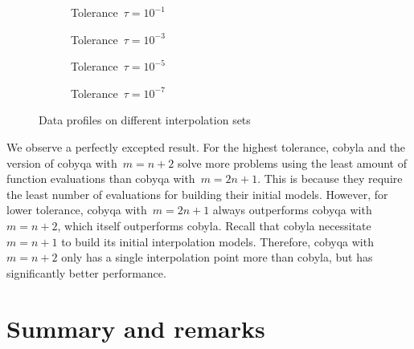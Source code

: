 \begin{figure}[ht]
    \centering
    \begin{subfigure}[b]{0.49\textwidth}
        \centering
        \caption{Tolerance~$\tau = 10^{-1}$}
    \end{subfigure}
    \hfill
    \begin{subfigure}[b]{0.49\textwidth}
        \centering
        \caption{Tolerance~$\tau = 10^{-3}$}
    \end{subfigure}
    \begin{subfigure}[b]{0.49\textwidth}
        \centering
        \caption{Tolerance~$\tau = 10^{-5}$}
    \end{subfigure}
    \hfill
    \begin{subfigure}[b]{0.49\textwidth}
        \centering
        \caption{Tolerance~$\tau = 10^{-7}$}
    \end{subfigure}
    \caption{Data profiles on different interpolation sets}
    \label{fig:data-interpolation-sets}
\end{figure}

We observe a perfectly excepted result.
For the highest tolerance, \gls{cobyla} and the version of \gls{cobyqa} with~$m = n + 2$ solve more problems using the least amount of function evaluations than \gls{cobyqa} with~$m = 2n + 1$.
This is because they require the least number of evaluations for building their initial models.
However, for lower tolerance, \gls{cobyqa} with~$m = 2n + 1$ always outperforms \gls{cobyqa} with~$m = n + 2$, which itself outperforms \gls{cobyla}.
Recall that \gls{cobyla} necessitate~$m = n + 1$ to build its initial interpolation models.
Therefore, \gls{cobyqa} with~$m = n + 2$ only has a single interpolation point more than \gls{cobyla}, but has significantly better performance.

\section{Summary and remarks}


